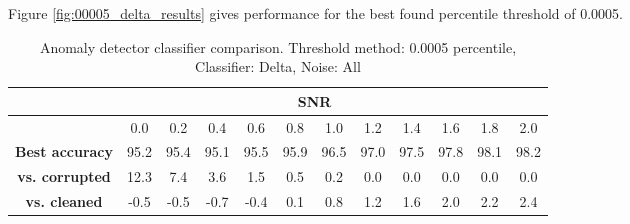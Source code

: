 Figure \ref{fig:00005_delta_results} gives performance for the best found percentile threshold of 0.0005. 

\begin{table}[ht]
    \centering
    \caption{Anomaly detector classifier comparison. Threshold method: 0.0005 percentile, Classifier: Delta, Noise: All}
    \begin{tabular}{c c c c c c c c c c c c}
    \hline\hline
    & \multicolumn{10}{c}{\textbf{SNR}} \\
    \hline
    & 0.0 & 0.2 & 0.4 & 0.6 & 0.8 & 1.0 & 1.2 & 1.4 & 1.6 & 1.8 & 2.0 \\
    \hline\hline
    \textbf{Best accuracy} & 95.2 & 95.4 & 95.1 & 95.5 & 95.9 & 96.5 & 97.0 & 97.5 & 97.8 & 98.1 & 98.2 \\
    \textbf{vs. corrupted} & 12.3 &  7.4 & 3.6 & 1.5 & 0.5 & 0.2 & 0.0 & 0.0 & 0.0 & 0.0 & 0.0 \\
    \textbf{vs. cleaned} & -0.5 & -0.5 & -0.7 & -0.4 & 0.1 & 0.8 & 1.2 & 1.6 & 2.0 & 2.2 & 2.4 \\
    \hline
    \end{tabular}
    \label{table:classifier_results}
\end{table}

